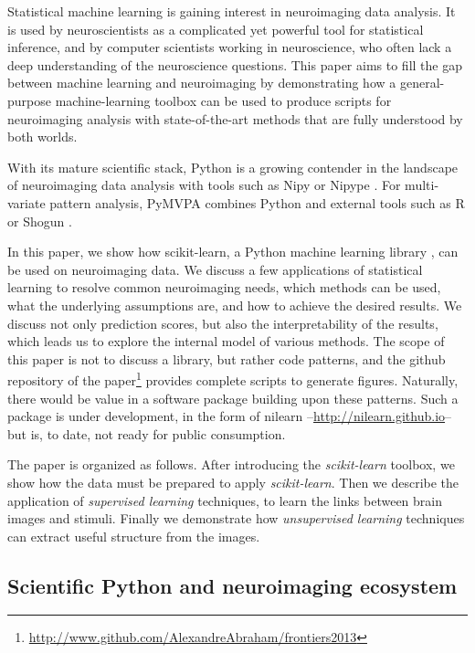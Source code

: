 \documentclass{frontiersSCNS} %
\begin{document}
Statistical machine learning is gaining interest in
neuroimaging data analysis. It is used by neuroscientists as a complicated yet powerful tool for statistical inference,
and by computer scientists working in neuroscience,
who often lack a deep understanding of the neuroscience questions. This paper aims to fill 
the gap between machine learning and neuroimaging by demonstrating how a 
general-purpose machine-learning toolbox can be used to produce scripts 
for neuroimaging analysis with state-of-the-art methods
that are fully understood by both worlds.

With its mature scientific stack, Python is a growing contender in the
landscape of neuroimaging data analysis with tools such as Nipy
\citep{millman2007analysis} or Nipype \citep{gorgolewski2011}.
For multi-variate pattern analysis, PyMVPA \citep{hanke2009pymvpa}
combines Python and external tools such as R or Shogun
\citep{sonnenburg2010}. 

In this paper, we show how scikit-learn, a Python machine learning
library \citep{pedregosa2011}, can be used on neuroimaging data.
We discuss a few applications of statistical learning to
resolve common neuroimaging needs, which methods can be used, what the underlying
assumptions are, and how to achieve the desired results. We discuss not only
prediction scores, but also the interpretability of the results, which
leads us to explore the internal model of various methods. The scope of this paper is not
to discuss a library, but rather code patterns, and the github repository
of the
paper\footnote{\url{http://www.github.com/AlexandreAbraham/frontiers2013}}
provides complete scripts to generate figures. Naturally, there would be
value in a software package building upon these patterns. Such a package
is under development, in the form of nilearn
--\url{http://nilearn.github.io}-- but is, to date, not ready
for public consumption.

The paper is organized as
follows. After introducing the \emph{scikit-learn} toolbox, we show 
how the data must be prepared to apply
\emph{scikit-learn}. Then we describe the application of \emph{supervised
learning} techniques, to learn the links between brain images and
stimuli. Finally we demonstrate how \emph{unsupervised learning}
techniques can extract useful structure from the images.


\subsection{Scientific Python and neuroimaging ecosystem}
\end{document}
